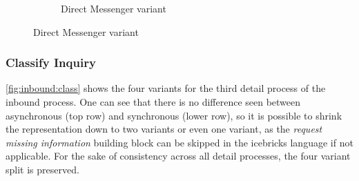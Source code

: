 \begin{figure}[caption={Preprocess inquiry detail process}, label={fig:inbound:prepr}]
\begin{subfigure}[b]{.45\textwidth}
\begin{tikzpicture}
	 		\end{tikzpicture}
	 		\caption{Direct Messenger variant}\label{fig:inbound:prepr:dm}
	 	\end{subfigure}
	 \end{figure}
	 
	 
	 \subsubsection{Classify Inquiry}
	 
	 \Fig \ref{fig:inbound:class} shows the four variants for the third detail process of the inbound process. One can see that there is no difference seen between asynchronous (top row) and synchronous (lower row), so it is possible to shrink the representation down to two variants or even one variant, as the \textit{request missing information} building block can be skipped in the icebricks language if not applicable. For the sake of consistency across all detail processes, the four variant split is preserved.
	 
